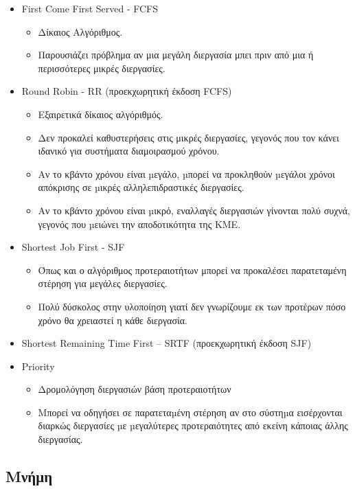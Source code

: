 \begin{itemize}
	\item	First Come First Served - FCFS
		\begin{itemize}
			\item	Δίκαιος Αλγόριθμος.
			\item	Παρουσιάζει πρόβλημα αν μια μεγάλη διεργασία μπει πριν από μια ή περισσότερες
				μικρές διεργασίες.
		\end{itemize}
	\item	Round Robin - RR (προεκχωρητική έκδοση FCFS)
		\begin{itemize}
			\item	Εξαιρετικά δίκαιος αλγόριθμός.
			\item	Δεν προκαλεί καθυστερήσεις στις μικρές διεργασίες, γεγονός που τον κάνει ιδανικό
				για συστήματα διαμοιρασμού χρόνου.
			\item	Αν το κβάντο χρόνου είναι µεγάλο, µπορεί να προκληθούν µεγάλοι χρόνοι
				απόκρισης σε µικρές αλληλεπιδραστικές διεργασίες.
			\item	Αν το κβάντο χρόνου είναι µικρό, εναλλαγές διεργασιών γίνονται πολύ συχνά, 
				γεγονός που µειώνει την αποδοτικότητα της ΚΜΕ.
		\end{itemize}
	\item	Shortest Job First - SJF
		\begin{itemize}
			\item	Όπως και ο αλγόριθμος προτεραιοτήτων μπορεί να προκαλέσει παρατεταμένη
				στέρηση για μεγάλες διεργασίες.
			\item	Πολύ δύσκολος στην υλοποίηση γιατί δεν γνωρίζουμε εκ των προτέρων πόσο
				χρόνο θα χρειαστεί η κάθε διεργασία.
		\end{itemize}
	\item 	Shortest Remaining Time First – SRTF (προεκχωρητική έκδοση SJF)
	\item	Priority
		\begin{itemize}
			\item	Δρομολόγηση διεργασιών βάση προτεραιοτήτων
			\item	Μπορεί να οδηγήσει σε παρατεταµένη στέρηση αν στο σύστηµα εισέρχονται διαρκώς
				διεργασίες µε µεγαλύτερες προτεραιότητες από εκείνη κάποιας άλλης διεργασίας.
		\end{itemize}
\end{itemize}

\subsection{Μνήμη}

